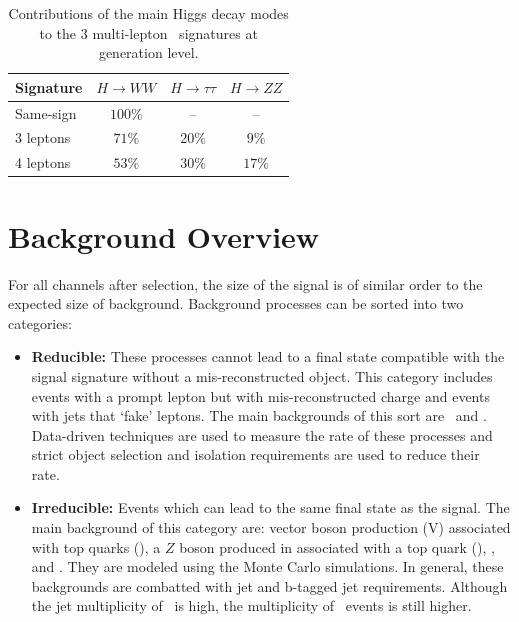 \begin{table}[htbp]
  \begin{center} 
    \caption{Contributions of the main Higgs decay modes to the 3 multi-lepton
      \tth\ signatures at generation level.
      }\label{ana:table_decay} 
      \begin{tabular}{l|c|c|c} 
      \hline\hline
  Signature & $H \rightarrow WW$  & $H\rightarrow \tau\tau$  & $H \rightarrow
  ZZ$  \\\hline
  Same-sign &  $100\%$ & -- & -- \\
  3 leptons  &  $71\%$ & $20\%$ & $9\%$ \\
  4 leptons  &  $53\%$ & $30\%$ & $17\%$  \\
     \hline
    \end{tabular}
  \end{center}
\end{table}



\section{Background Overview}

For all channels after selection, the size of the signal is of similar order to the expected size of background.
Background processes can be sorted into two categories:

\begin{itemize}

\item \textbf{Reducible:} These processes cannot lead to a final state compatible with the
  signal signature without a mis-reconstructed object. This category includes
  events with a prompt lepton but with mis-reconstructed charge and events
  with jets that `fake' leptons.  The main backgrounds of this sort are \ttbar\ and \zj. Data-driven techniques are used to measure the rate of these processes and strict object
  selection and isolation requirements are used to reduce their rate. 

\item \textbf{Irreducible:} Events which can lead to the same final state as the signal.
 The main background of this category are: vector boson production (V) associated with top quarks (\ttV), a $Z$ boson produced in associated with a top quark (\tZ), \WZ, and \ZZ.
 They are modeled using the Monte Carlo simulations. In general,
 these backgrounds are combatted with jet and b-tagged jet requirements. 
 Although the jet multiplicity of \ttV\ is high, the multiplicity of \tth\ 
 events is still higher. 

\end{itemize}


